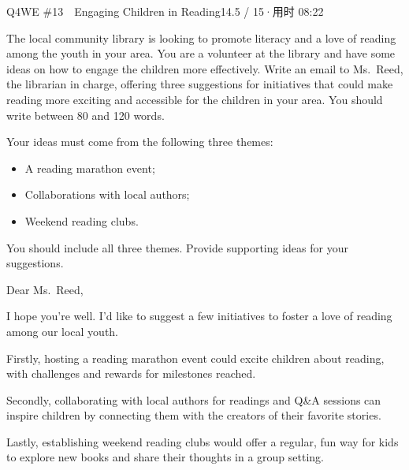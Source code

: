 \begin{qblock}{Q4\quad WE \#13\ \ Engaging Children in Reading}{14.5 / 15\quad·\quad 用时 08:22}

\begin{promptbox}
The local community library is looking to promote literacy and a love of reading among the youth in your area. You are a volunteer at the library and have some ideas on how to engage the children more effectively. Write an email to Ms.\ Reed, the librarian in charge, offering three suggestions for initiatives that could make reading more exciting and accessible for the children in your area. You should write between 80 and 120 words.

\smallskip Your ideas must come from the following three themes:
\begin{itemize}[leftmargin=1.4em,topsep=2pt,itemsep=0pt]
  \item A reading marathon event;
  \item Collaborations with local authors;
  \item Weekend reading clubs.
\end{itemize}
You should include all three themes. Provide supporting ideas for your suggestions.
\end{promptbox}

\begin{modelbox}
Dear Ms.\ Reed,

I hope you're well. I'd like to suggest a few initiatives to foster a love of reading among our local youth.

Firstly, hosting a reading marathon event could excite children about reading, with challenges and rewards for milestones reached.

Secondly, collaborating with local authors for readings and Q\&A sessions can inspire children by connecting them with the creators of their favorite stories.

Lastly, establishing weekend reading clubs would offer a regular, fun way for kids to explore new books and share their thoughts in a group setting.


\end{modelbox}
\end{qblock}
